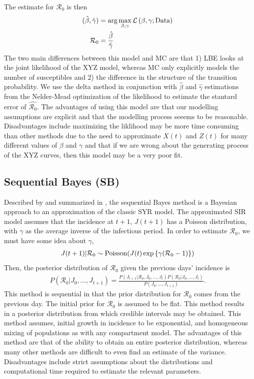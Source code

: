 \documentclass[12pt]{article}
\newcommand{\rr}{\ensuremath{\mathcal{R}_0}}
\begin{document}
The estimate for $\rr$ is then
\begin{align}\label{eq:lbe-r0}
  (\hat{\beta}, \hat{\gamma}) &= \arg \max_{\beta, \gamma} \mathcal{L}\left ( \beta, \gamma; \textnormal{Data} \right )\nonumber\\
  \rr &= \frac{\hat{\beta}}{\hat{\gamma}}
  \end{align}
  The two main differences between this model and MC are  that 1) LBE looks at the joint likelihood of the XYZ model, whereas MC only explicitly models the number of susceptibles and 2) the difference in the structure of the transition probability.  We use the delta method in conjunction with $\hat{\beta}$ and $\hat{\gamma}$ estimations from the Nelder-Mead optimization of the likelihood to estimate the stantard error of $\hat{\rr}$.
  The advantages of using this model are that our modelling assumptions are explicit and that the modelling process seeems to be reasonable.  Disadvantages include maximizing the liklihood may be more time consuming than other methods due to the need to approximate $X(t)$ and $Z(t)$ for many different values of $\beta$ and $\gamma$ and that if we are wrong about the generating process of the XYZ curves, then this model may be a very poor fit.





\subsection{Sequential Bayes (SB)}\label{sec:seqbayes}

Described by \cite{bettencourt2008} and summarized in \cite{obadia2012r0}, the sequential Bayes method is a Bayesian approach to an approximation of the classic SYR model.  The approximated SIR model assumes that the incidence at $t+1$, $J(t+1)$ has a Poisson distribution, with $\gamma$ as the  average inverse of the infectious period. In order to estimate $\rr$, we must have some idea about $\gamma$,
\begin{align*}
J(t+1) | \rr  \sim \textnormal{Poisson}( J(t) \exp \left \{  \gamma (\rr-1)\right \})
\end{align*}
Then, the posterior distribution of $\rr$ given the previous days' incidence is
\begin{align*}
  P(\rr | J_0, \dots, J_{t+1}) = \frac{P(J_{t+1} | \rr, J_0, \dots, J_t)P(\rr| J_0, \dots, J_t)}{P(J_0, \dots, J_{t+1})}.
\end{align*}
This method is sequential in that the prior distribution for $\rr$ comes from the previous day.  The initial prior for $\rr$ is assumed to be flat.  This method results in a posterior distribution from which credible intervals may be obtained.  This method assumes, initial growth in incidence to be exponential, and homogeneous mixing of populations as with any compartment model.  The advantages of this method are that of the ability to obtain an entire posterior distribution, whereas many other methods are difficult to even find an estimate of the variance.  Disadvantages include strict assumptions about the distributions and computational time required to estimate the relevant parameters.
\end{document}

